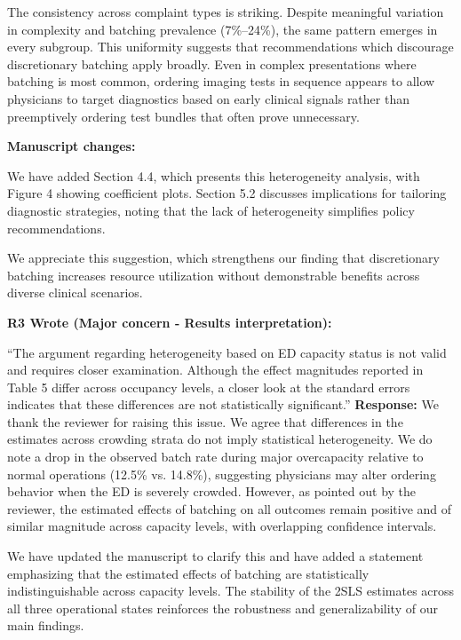\documentclass[11pt]{article}
\newenvironment{quote2}
{ \bigskip
\noindent
         \small\em
         \baselineskip=14pt
}
\newcommand{\1}{\hbox{\rm 1\kern-.35em 1}}
\begin{document}
The consistency across complaint types is striking. Despite meaningful variation in complexity and batching prevalence (7\%--24\%), the same pattern emerges in every subgroup. This uniformity suggests that recommendations which discourage discretionary batching apply broadly. Even in complex presentations where batching is most common, ordering imaging tests in sequence appears to allow physicians to target diagnostics based on early clinical signals rather than preemptively ordering test bundles that often prove unnecessary.

\textbf{Manuscript changes:}

We have added Section 4.4, which presents this heterogeneity analysis, with Figure 4 showing coefficient plots. Section 5.2 discusses implications for tailoring diagnostic strategies, noting that the lack of heterogeneity simplifies policy recommendations.

We appreciate this suggestion, which strengthens our finding that discretionary batching increases resource utilization without demonstrable benefits across diverse clinical scenarios.

\color{black}


\begin{quote2}
\textbf{R3 Wrote (Major concern -  Results interpretation):}  

\noindent``The argument regarding heterogeneity based on ED capacity status is not valid and requires closer examination. Although the effect magnitudes reported in Table 5 differ across occupancy levels, a closer look at the standard errors indicates that these differences are not statistically significant.''
\end{quote2}


\noindent\textbf{Response:} \color{blue}
We thank the reviewer for raising this issue. We agree that differences in the estimates across crowding strata do not imply statistical heterogeneity. We do note a drop in the observed batch rate during major overcapacity relative to normal operations (12.5\% vs. 14.8\%), suggesting physicians may alter ordering behavior when the ED is severely crowded. However, as pointed out by the reviewer, the estimated effects of batching on all outcomes remain positive and of similar magnitude across capacity levels, with overlapping confidence intervals.

We have updated the manuscript to clarify this and have added a statement emphasizing that the estimated effects of batching are statistically indistinguishable across capacity levels. The stability of the 2SLS estimates across all three operational states reinforces the robustness and generalizability of our main findings.
\end{document}
